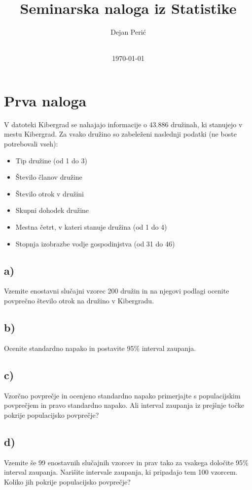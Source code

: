 \documentclass[12pt, a4paper]{article}
\title{Seminarska naloga iz Statistike}
\author{Dejan Perić \\~ \\ }
\date{\today}
\begin{document}

\maketitle




\section{Prva naloga}

V datoteki Kibergrad se nahajajo informacije o 43.886 družinah, 
ki stanujejo v mestu Kibergrad. Za vsako družino so zabeleženi 
naslednji podatki (ne boste potrebovali vseh):

\begin{itemize}
    \item Tip družine (od 1 do 3)
    \item Število članov družine
    \item Število otrok v družini
    \item Skupni dohodek družine
    \item Mestna četrt, v kateri stanuje družina (od 1 do 4)
    \item Stopnja izobrazbe vodje gospodinjstva (od 31 do 46)
\end{itemize}
    
\subsection{a)}
Vzemite enostavni slučajni vzorec 200 družin in na njegovi podlagi ocenite
povprečno število otrok na družino v Kibergradu.


\subsection{b)}
Ocenite standardno napako in postavite 95\% interval zaupanja.

\subsection{c)}
Vzorčno povprečje in ocenjeno standardno napako primerjajte s populacijskim
povprečjem in pravo standardno napako. Ali interval zaupanja iz prejšnje točke
pokrije populacijsko povprečje?

\subsection{d)}
Vzemite še 99 enostavnih slučajnih vzorcev in prav tako za vsakega določite
95\% interval zaupanja. Narišite intervale zaupanja, ki pripadajo tem 100 
vzorcem. Koliko jih pokrije populacijsko povprečje?
\end{document}
